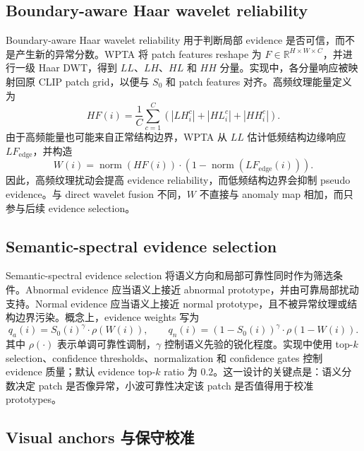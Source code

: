 \documentclass[runningheads]{llncs}
\newcommand{\normop}{\operatorname{norm}}
\begin{document}
\subsection{Boundary-aware Haar wavelet reliability}

Boundary-aware Haar wavelet reliability 用于判断局部 evidence 是否可信，而不是产生新的异常分数。WPTA 将 patch features reshape 为 $F\in\mathbb{R}^{H\times W\times C}$，并进行一级 Haar DWT，得到 $LL$、$LH$、$HL$ 和 $HH$ 分量。实现中，各分量响应被映射回原 CLIP patch grid，以便与 $S_0$ 和 patch features 对齐。高频纹理能量定义为
\begin{equation}
HF(i)=\frac{1}{C}\sum_{c=1}^{C}\left(|LH_i^c|+|HL_i^c|+|HH_i^c|\right).
\end{equation}
由于高频能量也可能来自正常结构边界，WPTA 从 $LL$ 估计低频结构边缘响应 $LF_{\mathrm{edge}}$，并构造
\begin{equation}
W(i)=\normop(HF(i))\cdot\left(1-\normop(LF_{\mathrm{edge}}(i))\right).
\end{equation}
因此，高频纹理扰动会提高 evidence reliability，而低频结构边界会抑制 pseudo evidence。与 direct wavelet fusion 不同，$W$ 不直接与 anomaly map 相加，而只参与后续 evidence selection。

\subsection{Semantic-spectral evidence selection}

Semantic-spectral evidence selection 将语义方向和局部可靠性同时作为筛选条件。Abnormal evidence 应当语义上接近 abnormal prototype，并由可靠局部扰动支持。Normal evidence 应当语义上接近 normal prototype，且不被异常纹理或结构边界污染。概念上，evidence weights 写为
\begin{equation}
q_a(i)=S_0(i)^\gamma\cdot\rho(W(i)),\qquad
q_n(i)=(1-S_0(i))^\gamma\cdot\rho(1-W(i)).
\end{equation}
其中 $\rho(\cdot)$ 表示单调可靠性调制，$\gamma$ 控制语义先验的锐化程度。实现中使用 top-$k$ selection、confidence thresholds、normalization 和 confidence gates 控制 evidence 质量；默认 evidence top-$k$ ratio 为 $0.2$。这一设计的关键点是：语义分数决定 patch 是否像异常，小波可靠性决定该 patch 是否值得用于校准 prototypes。

\subsection{Visual anchors 与保守校准}
\end{document}
